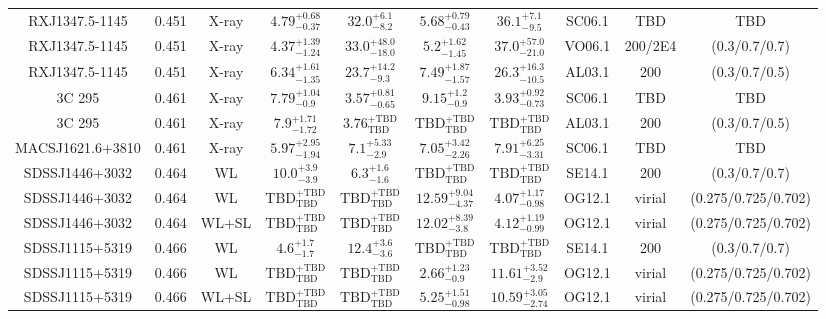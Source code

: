\begin{table}
\begin{tabular}{cccccccccc}
RXJ1347.5-1145 & 0.451 & X-ray & ${4.79}^{+0.68}_{-0.37}$ & ${32.0}^{+6.1}_{-8.2}$ & ${5.68}^{+0.79}_{-0.43}$ & ${36.1}^{+7.1}_{-9.5}$ & SC06.1 & TBD & TBD \\
RXJ1347.5-1145 & 0.451 & X-ray & ${4.37}^{+1.39}_{-1.24}$ & ${33.0}^{+48.0}_{-18.0}$ & ${5.2}^{+1.62}_{-1.45}$ & ${37.0}^{+57.0}_{-21.0}$ & VO06.1 & 200/2E4 & (0.3/0.7/0.7) \\
RXJ1347.5-1145 & 0.451 & X-ray & ${6.34}^{+1.61}_{-1.35}$ & ${23.7}^{+14.2}_{-9.3}$ & ${7.49}^{+1.87}_{-1.57}$ & ${26.3}^{+16.3}_{-10.5}$ & AL03.1 & 200 & (0.3/0.7/0.5) \\
3C 295 & 0.461 & X-ray & ${7.79}^{+1.04}_{-0.9}$ & ${3.57}^{+0.81}_{-0.65}$ & ${9.15}^{+1.2}_{-0.9}$ & ${3.93}^{+0.92}_{-0.73}$ & SC06.1 & TBD & TBD \\
3C 295 & 0.461 & X-ray & ${7.9}^{+1.71}_{-1.72}$ & ${3.76}^{+\mathrm{TBD}}_{\mathrm{TBD}}$ & ${\mathrm{TBD}}^{+\mathrm{TBD}}_{\mathrm{TBD}}$ & ${\mathrm{TBD}}^{+\mathrm{TBD}}_{\mathrm{TBD}}$ & AL03.1 & 200 & (0.3/0.7/0.5) \\
MACSJ1621.6+3810 & 0.461 & X-ray & ${5.97}^{+2.95}_{-1.94}$ & ${7.1}^{+5.33}_{-2.9}$ & ${7.05}^{+3.42}_{-2.26}$ & ${7.91}^{+6.25}_{-3.31}$ & SC06.1 & TBD & TBD \\
SDSSJ1446+3032 & 0.464 & WL & ${10.0}^{+3.9}_{-3.9}$ & ${6.3}^{+1.6}_{-1.6}$ & ${\mathrm{TBD}}^{+\mathrm{TBD}}_{\mathrm{TBD}}$ & ${\mathrm{TBD}}^{+\mathrm{TBD}}_{\mathrm{TBD}}$ & SE14.1 & 200 & (0.3/0.7/0.7) \\
SDSSJ1446+3032 & 0.464 & WL & ${\mathrm{TBD}}^{+\mathrm{TBD}}_{\mathrm{TBD}}$ & ${\mathrm{TBD}}^{+\mathrm{TBD}}_{\mathrm{TBD}}$ & ${12.59}^{+9.04}_{-4.37}$ & ${4.07}^{+1.17}_{-0.98}$ & OG12.1 & virial & (0.275/0.725/0.702) \\
SDSSJ1446+3032 & 0.464 & WL+SL & ${\mathrm{TBD}}^{+\mathrm{TBD}}_{\mathrm{TBD}}$ & ${\mathrm{TBD}}^{+\mathrm{TBD}}_{\mathrm{TBD}}$ & ${12.02}^{+8.39}_{-3.8}$ & ${4.12}^{+1.19}_{-0.99}$ & OG12.1 & virial & (0.275/0.725/0.702) \\
SDSSJ1115+5319 & 0.466 & WL & ${4.6}^{+1.7}_{-1.7}$ & ${12.4}^{+3.6}_{-3.6}$ & ${\mathrm{TBD}}^{+\mathrm{TBD}}_{\mathrm{TBD}}$ & ${\mathrm{TBD}}^{+\mathrm{TBD}}_{\mathrm{TBD}}$ & SE14.1 & 200 & (0.3/0.7/0.7) \\
SDSSJ1115+5319 & 0.466 & WL & ${\mathrm{TBD}}^{+\mathrm{TBD}}_{\mathrm{TBD}}$ & ${\mathrm{TBD}}^{+\mathrm{TBD}}_{\mathrm{TBD}}$ & ${2.66}^{+1.23}_{-0.9}$ & ${11.61}^{+3.52}_{-2.9}$ & OG12.1 & virial & (0.275/0.725/0.702) \\
SDSSJ1115+5319 & 0.466 & WL+SL & ${\mathrm{TBD}}^{+\mathrm{TBD}}_{\mathrm{TBD}}$ & ${\mathrm{TBD}}^{+\mathrm{TBD}}_{\mathrm{TBD}}$ & ${5.25}^{+1.51}_{-0.98}$ & ${10.59}^{+3.05}_{-2.74}$ & OG12.1 & virial & (0.275/0.725/0.702) \\

\end{tabular}
\end{table}
